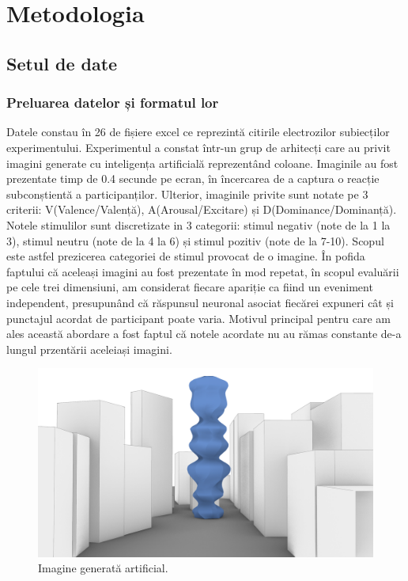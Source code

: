 \def\totalEpoci{5598}
\def\totalEpociTestare{0}
\def\totalEpociValentaPozitiva{1014}
\def\totalEpociValentaNegativa{942}
\def\totalEpociValentaNeutra{3642}
\def\crestereAcurateteAutoReject{10}
\def\nrParticipantiAntrenare{21}
\def\nrParticipantiValidare{2}
\def\nrParticipantiTestare{3}

\chapter{Metodologia}

\section{Setul de date}
\subsection{Preluarea datelor și formatul lor}
Datele constau în 26 de fișiere excel ce reprezintă citirile electrozilor subiecților experimentului.
Experimentul a constat într-un grup de arhitecți care au privit imagini generate cu inteligența artificială reprezentând coloane. Imaginile au fost prezentate timp de 0.4 secunde pe ecran, în încercarea de a captura o reacție subconștientă a participanților.
Ulterior, imaginile  privite sunt notate pe 3 criterii: V(Valence/Valență), A(Arousal/Excitare) și D(Dominance/Dominanță). 
Notele stimulilor sunt discretizate in 3 categorii: stimul negativ (note de la 1 la 3), stimul neutru (note de la 4 la 6) și stimul pozitiv (note de la 7-10). 
Scopul este astfel prezicerea categoriei de stimul provocat de o imagine. În pofida faptului că aceleași imagini au fost prezentate în mod repetat, în scopul evaluării pe cele trei dimensiuni, am considerat fiecare apariție ca fiind un eveniment independent, presupunând că răspunsul neuronal asociat fiecărei expuneri cât și punctajul acordat de participant poate varia. Motivul principal pentru care am ales această abordare a fost faptul că notele acordate nu au rămas constante de-a lungul przentării aceleiași imagini.

\begin{figure}[H]
    \centering
		\vspace{-1em}
    \includegraphics[width=0.5\linewidth]{stimul_image.png}
    \caption{Imagine generată artificial.}
		\vspace{-1em}
    \label{fig:enter-label}
\end{figure}

